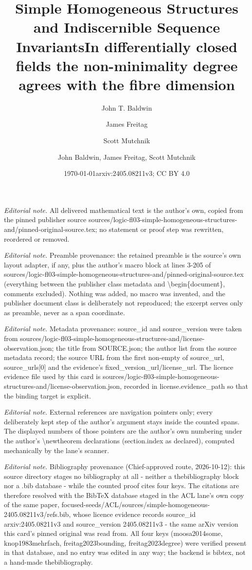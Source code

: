 \documentclass[10pt,a4paper]{amsart}
\title{Simple Homogeneous Structures and Indiscernible Sequence Invariants}
\author[1]{John T. Baldwin}
\author[2]{James Freitag}
\author[3]{Scott Mutchnik}
\date{\today}
\title{In differentially closed fields the non-minimality degree agrees with the fibre dimension}
\author{John Baldwin, James Freitag, Scott Mutchnik}
\date{arxiv:2405.08211v3; CC BY 4.0}
\theoremstyle{definition}
\theoremstyle{remark}
\numberwithin{equation}{section}
\begin{document}
\maketitle
\noindent\textit{Editorial note.} All delivered mathematical text is the author's own, copied from the pinned publisher source sources/logic-fl03-simple-homogeneous-structures-and/pinned-original-source.tex; no statement or proof step was rewritten, reordered or removed.\par\medskip
\noindent\textit{Editorial note.} Preamble provenance: the retained preamble is the source's own layout adapter, if any, plus the author's macro block at lines 3-205 of sources/logic-fl03-simple-homogeneous-structures-and/pinned-original-source.tex (everything between the publisher class metadata and \textbackslash{}begin\{document\}, comments excluded). Nothing was added, no macro was invented, and the publisher document class is deliberately not reproduced; the excerpt serves only as preamble, never as a span coordinate.\par\medskip
\noindent\textit{Editorial note.} Metadata provenance: source\_id and source\_version were taken from sources/logic-fl03-simple-homogeneous-structures-and/license-observation.json; the title from SOURCE.json; the author list from the source metadata record; the source URL from the first non-empty of source\_url, source\_urls[0] and the evidence's fixed\_version\_url/license\_url. The licence evidence file used by this card is sources/logic-fl03-simple-homogeneous-structures-and/license-observation.json, recorded in license.evidence\_path so that the binding target is explicit.\par\medskip
\noindent\textit{Editorial note.} External references are navigation pointers only; every deliberately kept step of the author's argument stays inside the counted spans. The displayed numbers of those pointers are the author's own numbering under the author's \textbackslash{}newtheorem declarations (section.index as declared), computed mechanically by the lane's scanner.\par\medskip
\noindent\textit{Editorial note.} Bibliography provenance (Chief-approved route, 2026-10-12): this source directory stages no bibliography at all - neither a thebibliography block nor a .bib database - while the counted proof cites four keys. The citations are therefore resolved with the BibTeX database staged in the ACL lane's own copy of the same paper, focused-seeds/ACL/sources/simple-homogeneous-2405.08211v3/refs.bib, whose licence evidence records source\_id arxiv:2405.08211v3 and source\_version 2405.08211v3 - the same arXiv version this card's pinned original was read from. All four keys (moosa2014some, knop1983mehrfach, freitag2023bounding, freitag2023degree) were verified present in that database, and no entry was edited in any way; the backend is bibtex, not a hand-made thebibliography.\par\medskip
\end{document}
